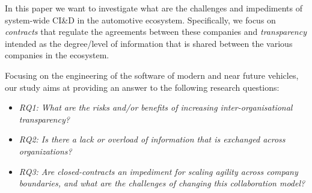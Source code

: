 In this paper we want to investigate %
what are the challenges and impediments of system-wide CI\&D in the automotive ecosystem. 
Specifically, we focus on {\em contracts} that regulate the agreements between these companies 
and {\em transparency} intended as the degree/level of information that is shared between the various companies in the ecosystem. 

Focusing on the engineering of the software of modern and near future vehicles, our study aims at providing an answer to the following research questions:

%

\begin{itemize}
\item {\em RQ1: What are the risks and/or benefits of increasing inter-organisational transparency?}
\item {\em RQ2: Is there a lack or overload of information that is exchanged across organizations?} 
\item {\em RQ3: Are closed-contracts an impediment for scaling agility across company boundaries, and what are the challenges of changing this collaboration model?} %
\end{itemize}

